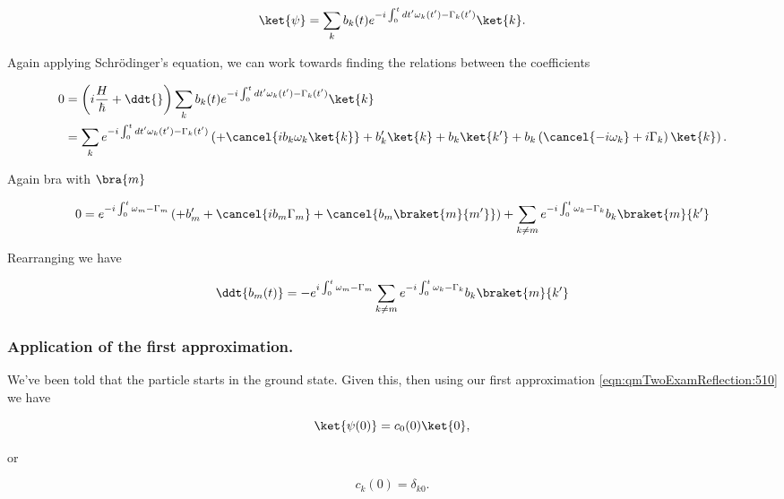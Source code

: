 \begin{equation}\label{eqn:qmTwoExamReflection:530}
\ket{\psi}
=
\sum_k b_k(t) e^{-i \int_0^t dt' \omega_k(t') - \Gamma_k(t') } \ket{k}.
\end{equation}

Again applying Schr\"{o}dinger's equation, we can work towards finding the relations between the coefficients

\begin{align*}
0 
&=
\left( i\frac{H}{\hbar} + \ddt{} \right)
\sum_k b_k(t) e^{-i \int_0^t dt' \omega_k(t') - \Gamma_k(t') } \ket{k} 
\\
&=
\sum_k e^{-i \int_0^t dt' \omega_k(t') - \Gamma_k(t') } 
\left(
+ \cancel{i b_k \omega_k \ket{k} }
+ b_k' \ket{k} 
+ b_k \ket{k'} 
+ b_k \left( \cancel{-i \omega_k} +i \Gamma_k \right) \ket{k} 
\right).
\end{align*}

Again bra with $\bra{m}$

\begin{align*}
0 
=
e^{-i \int_0^t  \omega_m - \Gamma_m } 
\left(
+ b_m' 
+ \cancel{i b_m \Gamma_m }
+ \cancel{b_m \braket{m}{m'} }
\right)
+\sum_{k\ne m} e^{-i \int_0^t  \omega_k - \Gamma_k } b_k \braket{m}{k'} 
\end{align*}

Rearranging we have

\begin{equation}\label{eqn:qmTwoExamReflection:550}
\ddt{b_m(t)} = 
-
e^{i \int_0^t  \omega_m - \Gamma_m } 
\sum_{k\ne m} e^{-i \int_0^t \omega_k - \Gamma_k } b_k \braket{m}{k'} 
\end{equation}

\subsubsection{Application of the first approximation.}

We've been told that the particle starts in the ground state.  Given this, then using our first approximation \ref{eqn:qmTwoExamReflection:510} we have

\begin{equation}\label{eqn:qmTwoExamReflection:730}
\ket{\psi(0)} = c_0(0) \ket{0},
\end{equation}

or

\begin{equation}\label{eqn:qmTwoExamReflection:750}
c_k(0) = \delta_{k 0}.
\end{equation}

